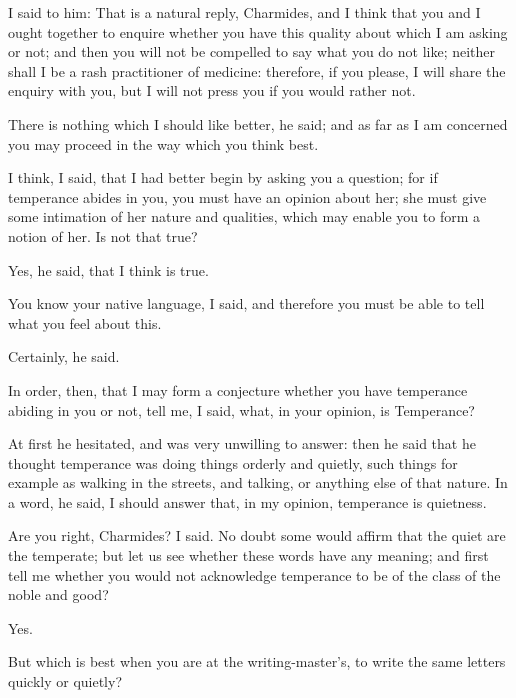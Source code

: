 \documentclass[11pt,letter]{article}
\begin{document}
\par  I said to him: That is a natural reply, Charmides, and I think that you and I ought together to enquire whether you have this quality about which I am asking or not; and then you will not be compelled to say what you do not like; neither shall I be a rash practitioner of medicine: therefore, if you please, I will share the enquiry with you, but I will not press you if you would rather not.

\par  There is nothing which I should like better, he said; and as far as I am concerned you may proceed in the way which you think best.

\par  I think, I said, that I had better begin by asking you a question; for if temperance abides in you, you must have an opinion about her; she must give some intimation of her nature and qualities, which may enable you to form a notion of her. Is not that true?

\par  Yes, he said, that I think is true.

\par  You know your native language, I said, and therefore you must be able to tell what you feel about this.

\par  Certainly, he said.

\par  In order, then, that I may form a conjecture whether you have temperance abiding in you or not, tell me, I said, what, in your opinion, is Temperance?

\par  At first he hesitated, and was very unwilling to answer: then he said that he thought temperance was doing things orderly and quietly, such things for example as walking in the streets, and talking, or anything else of that nature. In a word, he said, I should answer that, in my opinion, temperance is quietness.

\par  Are you right, Charmides? I said. No doubt some would affirm that the quiet are the temperate; but let us see whether these words have any meaning; and first tell me whether you would not acknowledge temperance to be of the class of the noble and good?

\par  Yes.

\par  But which is best when you are at the writing-master's, to write the same letters quickly or quietly?
\end{document}
